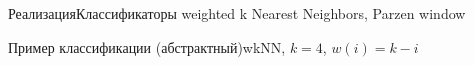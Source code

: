 \documentclass[red,unicode]{beamer}
\begin{document}
\begin{frame}[containsverbatim]{Реализация}{Классификаторы weighted k Nearest Neighbors, Parzen window}
~\\[-0.8cm]
\begin{block}{}
\footnotesize

\end{block}
\end{frame}

\begin{frame}{Пример классификации (абстрактный)}{wkNN, $k = 4$, $w(i)=k-i$}
\end{frame}
\end{document}
